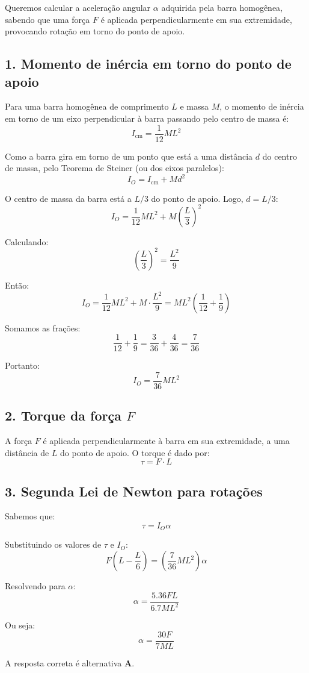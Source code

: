 \documentclass[a4paper,12pt]{article}
\begin{document}
\begin{flushleft}
Queremos calcular a aceleração angular $\alpha$ adquirida pela barra homogênea, sabendo que uma força $F$ é aplicada perpendicularmente em sua extremidade, provocando rotação em torno do ponto de apoio.

\subsection*{1. Momento de inércia em torno do ponto de apoio}

Para uma barra homogênea de comprimento $L$ e massa $M$, o momento de inércia em torno de um eixo perpendicular à barra passando pelo centro de massa é:
\[
I_{\text{cm}} = \frac{1}{12} M L^2
\]

Como a barra gira em torno de um ponto que está a uma distância $d$ do centro de massa, pelo Teorema de Steiner (ou dos eixos paralelos):
\[
I_O = I_{\text{cm}} + M d^2
\]

O centro de massa da barra está a $L/3$ do ponto de apoio. Logo, $d = L/3$:
\[
I_O = \frac{1}{12} M L^2 + M \left( \frac{L}{3} \right)^2
\]

Calculando:
\[
\left( \frac{L}{3} \right)^2 = \frac{L^2}{9}
\]

Então:
\[
I_O = \frac{1}{12} M L^2 + M \cdot \frac{L^2}{9} = M L^2 \left( \frac{1}{12} + \frac{1}{9} \right)
\]

Somamos as frações:
\[
\frac{1}{12} + \frac{1}{9} = \frac{3}{36} + \frac{4}{36} = \frac{7}{36}
\]

Portanto:
\[
I_O = \frac{7}{36} M L^2
\]

\subsection*{2. Torque da força $F$}

A força $F$ é aplicada perpendicularmente à barra em sua extremidade, a uma distância de $L$ do ponto de apoio. O torque é dado por:
\[
\tau = F \cdot L
\]

\subsection*{3. Segunda Lei de Newton para rotações}

Sabemos que:
\[
\tau = I_O \alpha
\]

Substituindo os valores de $\tau$ e $I_O$:
\[
F \left(L - \frac{L}{6} \right) = \left( \frac{7}{36} M L^2 \right) \alpha
\]

Resolvendo para $\alpha$:
\[
\alpha = \frac{5.36FL}{6.7M L^2}
\]

Ou seja:
\[
\boxed{
\alpha = \frac{30 F}{7ML}
}
\]

A resposta correta é alternativa \colorbox{green!50}{\textbf{A}}.

\end{flushleft}
\end{document}
